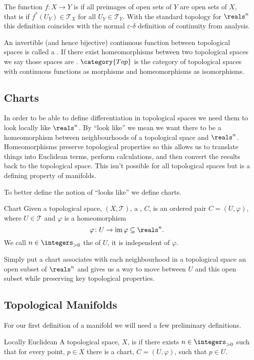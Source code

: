 The function \(f \colon X \to Y\) is  if all preimages of open sets of \(Y\) are open sets of \(X\), that is if \(f^*(U_Y) \in \mathcal{T}_X\) for all \(U_Y \in \mathcal{T}_Y\).
With the standard topology for \(\reals^n\) this definition coincides with the normal \(\varepsilon\)-\(\delta\) definition of continuity from analysis.

An invertible (and hence bijective) continuous function between topological spaces is called a .
If there exist homeomorphisms between two topological spaces we say those spaces are .
\(\category{Top}\) is the category of topological spaces with continuous functions as morphisms and homeomorphisms as isomorphisms.

\subsection{Charts}
In order to be able to define differentiation in topological spaces we need them to look locally like \(\reals^n\).
By \enquote{look like} we mean we want there to be a homeomorphism between neighbourhoods of a topological space and \(\reals^n\).
Homeomorphisms preserve topological properties so this allows us to translate things into Euclidean terms, perform calculations, and then convert the results back to the topological space.
This isn't possible for all topological spaces but is a defining property of manifolds.

To better define the notion of \enquote{looks like} we define charts.

\begin{dfn}{Chart}{}
    Given a topological space, \((X, \mathcal{T})\), a , \(C\), is an ordered pair \(C = (U, \varphi)\), where \(U \in \mathcal{T}\) and \(\varphi\) is a homeomorphism
    \begin{equation}
        \varphi \colon U \to \mathop{\mathrm{im}}\varphi \subseteq \reals^n.
    \end{equation}
    We call \(n \in \integers_{>0}\) the  of \(U\), it is independent of \(\varphi\).
\end{dfn}

Simply put a chart associates with each neighbourhood in a topological space an open subset of \(\reals^n\) and gives us a way to move between \(U\) and this open subset while preserving key topological properties.

\subsection{Topological Manifolds}
For our first definition of a manifold we will need a few preliminary definitions.
\begin{dfn}{Locally Euclidean}{}
    A topological space, \(X\), is  if there exists \(n \in \integers_{>0}\) such that for every point, \(p \in X\) there is a chart, \(C = (U, \varphi)\), such that \(p \in U\).
\end{dfn}

